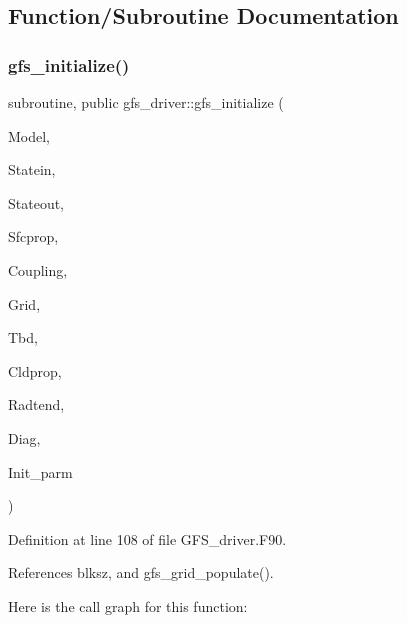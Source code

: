 \subsection{Function/\+Subroutine Documentation}
\mbox{\label{namespacegfs__driver_aa53fa4a0921c4443630976402933ff44}} 
\subsubsection{gfs\+\_\+initialize()}
{\footnotesize\ttfamily subroutine, public gfs\+\_\+driver\+::gfs\+\_\+initialize (\begin{DoxyParamCaption}\item[{type(gfs\+\_\+control\+\_\+type), intent(inout)}]{Model,  }\item[{type(gfs\+\_\+statein\+\_\+type), dimension(\+:), intent(inout)}]{Statein,  }\item[{type(gfs\+\_\+stateout\+\_\+type), dimension(\+:), intent(inout)}]{Stateout,  }\item[{type(gfs\+\_\+sfcprop\+\_\+type), dimension(\+:), intent(inout)}]{Sfcprop,  }\item[{type(gfs\+\_\+coupling\+\_\+type), dimension(\+:), intent(inout)}]{Coupling,  }\item[{type(gfs\+\_\+grid\+\_\+type), dimension(\+:), intent(inout)}]{Grid,  }\item[{type(gfs\+\_\+tbd\+\_\+type), dimension(\+:), intent(inout)}]{Tbd,  }\item[{type(gfs\+\_\+cldprop\+\_\+type), dimension(\+:), intent(inout)}]{Cldprop,  }\item[{type(gfs\+\_\+radtend\+\_\+type), dimension(\+:), intent(inout)}]{Radtend,  }\item[{type(gfs\+\_\+diag\+\_\+type), dimension(\+:), intent(inout)}]{Diag,  }\item[{type(gfs\+\_\+init\+\_\+type), intent(in)}]{Init\+\_\+parm }\end{DoxyParamCaption})}



Definition at line 108 of file G\+F\+S\+\_\+driver.\+F90.



References blksz, and gfs\+\_\+grid\+\_\+populate().

Here is the call graph for this function\+:
\mbox{\label{namespacegfs__driver_ad673b930d2e2319a99586ec2232ebea0}} 
